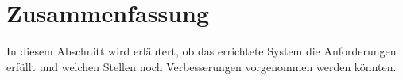 \section{Zusammenfassung}

In diesem Abschnitt wird erläutert, ob das errichtete System die Anforderungen
erfüllt und welchen Stellen noch Verbesserungen vorgenommen werden könnten.




